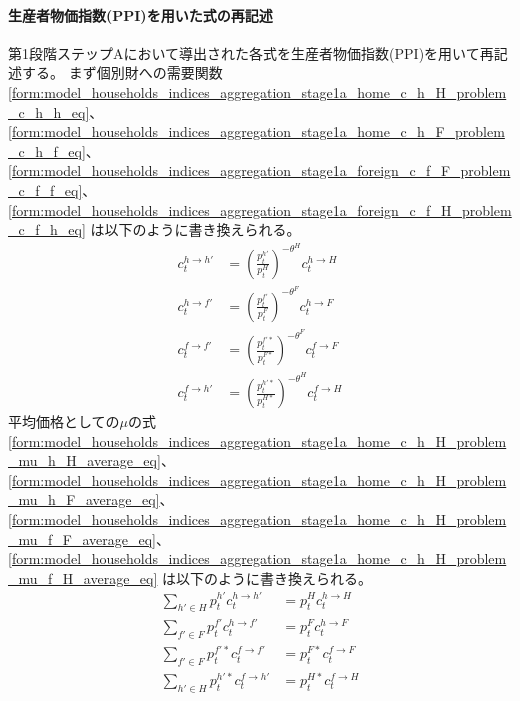 \paragraph{生産者物価指数(PPI)を用いた式の再記述}
\label{sec:model_households_indices_aggregation_stage1a_ppi_descriptions}
第1段階ステップAにおいて導出された各式を生産者物価指数(PPI)を用いて再記述する。
まず個別財への需要関数
\eqref{form:model_households_indices_aggregation_stage1a_home_c_h_H_problem_c_h_h_eq}、
\eqref{form:model_households_indices_aggregation_stage1a_home_c_h_F_problem_c_h_f_eq}、
\eqref{form:model_households_indices_aggregation_stage1a_foreign_c_f_F_problem_c_f_f_eq}、
\eqref{form:model_households_indices_aggregation_stage1a_foreign_c_f_H_problem_c_f_h_eq}
は以下のように書き換えられる。
\begin{align}
    \label{form:model_households_indices_aggregation_stage1a_ppi_descriptions_c_h_h_eq}
        c_t^{h\to h'}&=\left(\frac{p_t^{h'}}{p_t^H}\right)^{-\theta^H}c_t^{h\to H} \\
    \label{form:model_households_indices_aggregation_stage1a_ppi_descriptions_c_h_f_eq}
        c_t^{h\to f'}&=\left(\frac{p_t^{f'}}{p_t^F}\right)^{-\theta^F}c_t^{h\to F} \\
    \label{form:model_households_indices_aggregation_stage1a_ppi_descriptions_c_f_f_eq}
        c_t^{f\to f'}&=\left(\frac{p_t^{f'*}}{p_t^{F*}}\right)^{-\theta^F}c_t^{f\to F} \\
    \label{form:model_households_indices_aggregation_stage1a_ppi_descriptions_c_f_h_eq}
        c_t^{f\to h'}&=\left(\frac{p_t^{h'*}}{p_t^{H*}}\right)^{-\theta^H}c_t^{f\to H}
\end{align}
平均価格としての\(\mu\)の式
\eqref{form:model_households_indices_aggregation_stage1a_home_c_h_H_problem_mu_h_H_average_eq}、
\eqref{form:model_households_indices_aggregation_stage1a_home_c_h_H_problem_mu_h_F_average_eq}、
\eqref{form:model_households_indices_aggregation_stage1a_home_c_h_H_problem_mu_f_F_average_eq}、
\eqref{form:model_households_indices_aggregation_stage1a_home_c_h_H_problem_mu_f_H_average_eq}
は以下のように書き換えられる。
\begin{align}
    \label{form:model_households_indices_aggregation_stage1a_ppi_descriptions_p_H_agerage_eq}
        \sum_{h'\in H}p_t^{h'}c_t^{h\to h'}&=p_t^Hc_t^{h\to H} \\
    \label{form:model_households_indices_aggregation_stage1a_ppi_descriptions_p_F_agerage_eq}
        \sum_{f'\in F}p_t^{f'}c_t^{h\to f'}&=p_t^Fc_t^{h\to F} \\
    \label{form:model_households_indices_aggregation_stage1a_ppi_descriptions_p_F_star_agerage_eq}
        \sum_{f'\in F}p_t^{f'*}c_t^{f\to f'}&=p_t^{F*}c_t^{f\to F} \\
    \label{form:model_households_indices_aggregation_stage1a_ppi_descriptions_p_H_star_agerage_eq}
        \sum_{h'\in H}p_t^{h'*}c_t^{f\to h'}&=p_t^{H*}c_t^{f\to H}
\end{align}
